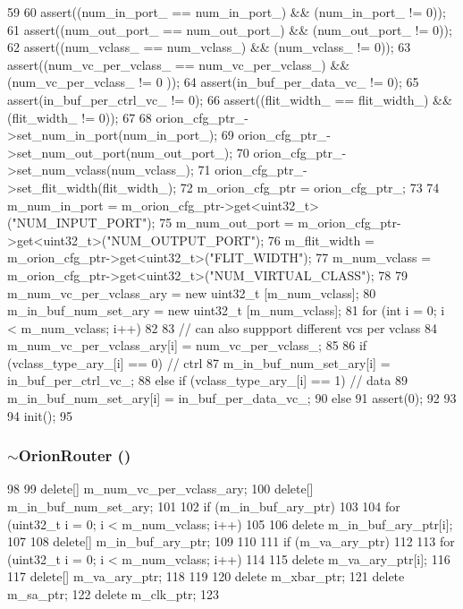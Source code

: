 \begin{DoxyCode}
59 {
60     assert((num_in_port_ == num_in_port_) && (num_in_port_ != 0));
61     assert((num_out_port_ == num_out_port_) && (num_out_port_ != 0));
62     assert((num_vclass_ == num_vclass_) && (num_vclass_ != 0));
63     assert((num_vc_per_vclass_ == num_vc_per_vclass_) && (num_vc_per_vclass_ != 0
      ));
64     assert(in_buf_per_data_vc_ != 0);
65     assert(in_buf_per_ctrl_vc_ != 0);
66     assert((flit_width_ == flit_width_) && (flit_width_ != 0));
67 
68     orion_cfg_ptr_->set_num_in_port(num_in_port_);
69     orion_cfg_ptr_->set_num_out_port(num_out_port_);
70     orion_cfg_ptr_->set_num_vclass(num_vclass_);
71     orion_cfg_ptr_->set_flit_width(flit_width_);
72     m_orion_cfg_ptr = orion_cfg_ptr_;
73 
74     m_num_in_port = m_orion_cfg_ptr->get<uint32_t>("NUM_INPUT_PORT");
75     m_num_out_port = m_orion_cfg_ptr->get<uint32_t>("NUM_OUTPUT_PORT");
76     m_flit_width = m_orion_cfg_ptr->get<uint32_t>("FLIT_WIDTH");
77     m_num_vclass = m_orion_cfg_ptr->get<uint32_t>("NUM_VIRTUAL_CLASS");
78 
79     m_num_vc_per_vclass_ary = new uint32_t [m_num_vclass];
80     m_in_buf_num_set_ary = new uint32_t [m_num_vclass];
81     for (int i = 0; i < m_num_vclass; i++)
82     {
83         // can also suppport different vcs per vclass
84         m_num_vc_per_vclass_ary[i] = num_vc_per_vclass_;
85 
86         if (vclass_type_ary_[i] == 0) // ctrl
87             m_in_buf_num_set_ary[i] = in_buf_per_ctrl_vc_;
88         else if (vclass_type_ary_[i] == 1) // data
89             m_in_buf_num_set_ary[i] = in_buf_per_data_vc_;
90         else
91             assert(0);
92     }
93 
94     init();
95 }
\end{DoxyCode}
\hypertarget{classOrionRouter_a72b1eb77cfa9164b0d26fddbf92e9de7}{
\subsubsection[{$\sim$OrionRouter}]{\setlength{\rightskip}{0pt plus 5cm}$\sim${\bf OrionRouter} ()}}
\label{classOrionRouter_a72b1eb77cfa9164b0d26fddbf92e9de7}



\begin{DoxyCode}
98 {
99     delete[] m_num_vc_per_vclass_ary;
100     delete[] m_in_buf_num_set_ary;
101 
102     if (m_in_buf_ary_ptr)
103     {
104         for (uint32_t i = 0; i < m_num_vclass; i++)
105         {
106             delete m_in_buf_ary_ptr[i];
107         }
108         delete[] m_in_buf_ary_ptr;
109     }
110 
111     if (m_va_ary_ptr)
112     {
113         for (uint32_t i = 0; i < m_num_vclass; i++)
114         {
115             delete m_va_ary_ptr[i];
116         }
117         delete[] m_va_ary_ptr;
118     }
119 
120     delete m_xbar_ptr;
121     delete m_sa_ptr;
122     delete m_clk_ptr;
123 }
\end{DoxyCode}


